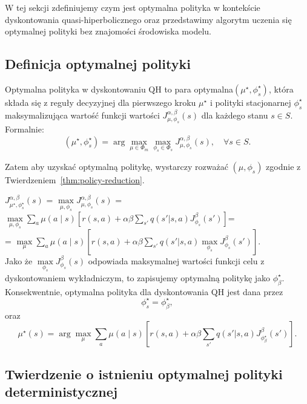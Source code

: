 W tej sekcji zdefiniujemy czym jest optymalna polityka w kontekście dyskontowania quasi-hiperbolicznego oraz przedstawimy algorytm uczenia się optymalnej polityki bez znajomości środowiska modelu.
\subsection{Definicja optymalnej polityki}
Optymalna polityka w dyskontowaniu QH to para optymalna$(\mu^\star, \phi_s^\star)$, która składa się z reguły decyzyjnej dla pierwszego kroku $\mu^\star$ i polityki stacjonarnej $\phi_s^\star$ maksymalizująca wartość funkcji wartości $J^{\alpha, \beta}_{\mu, \phi_s}(s)$ dla każdego stanu $s \in S$. Formalnie:
\begin{equation}
(\mu^\star, \phi_s^\star) = \arg\max_{\mu \in \Phi_m} \max_{\phi_s \in \Phi_s} J^{\alpha, \beta}_{\mu, \phi_s}(s), \quad \forall s \in S.
\end{equation}

Zatem aby uzyskać optymalną politykę, wystarczy rozważać $(\mu, \phi_s)$ zgodnie z Twierdzeniem~\ref{thm:policy-reduction}.

$J^{\alpha, \beta}_{\mu^\star, \phi_s^\star}(s)$ = $\max\limits_{\mu,\phi_s} J^{\alpha, \beta}_{\mu, \phi_s}(s)$ = $\max\limits_{\mu,\phi_s} \sum\limits_a \mu(a\mid s) \left[ r(s, a) + \alpha\beta \sum\limits_{s'} q(s'|s, a) J^{\beta}_{\phi_s}(s') \right]$=\\= $\max\limits_{\mu} \sum\limits_a \mu(a\mid s) \left[ r(s, a) + \alpha\beta \sum\limits_{s'} q(s'|s, a) \max\limits_{\phi_s} J^{\beta}_{\phi_s}(s') \right].$ \\
Jako że $\max\limits_{\phi_s} J^{\beta}_{\phi_s}(s)$ odpowiada maksymalnej wartości funkcji celu z dyskontowaniem wykładniczym, to zapisujemy optymalną politykę jako $\phi^\star_\beta$. Konsekwentnie, optymalna polityka dla dyskontowania QH jest dana przez 
\[
\phi_s^\star = \phi^\star_\beta,
\]
oraz
\begin{equation}
\mu^\star(s) = \arg\max_{\mu}\sum\limits_{a}\mu(a\mid s) \left[ r(s, a) + \alpha \beta \sum_{s'} q(s'|s, a) J^{\beta}_{\phi^\star_\beta}(s') \right].
\end{equation}
\subsection{Twierdzenie o istnieniu optymalnej polityki deterministycznej}

